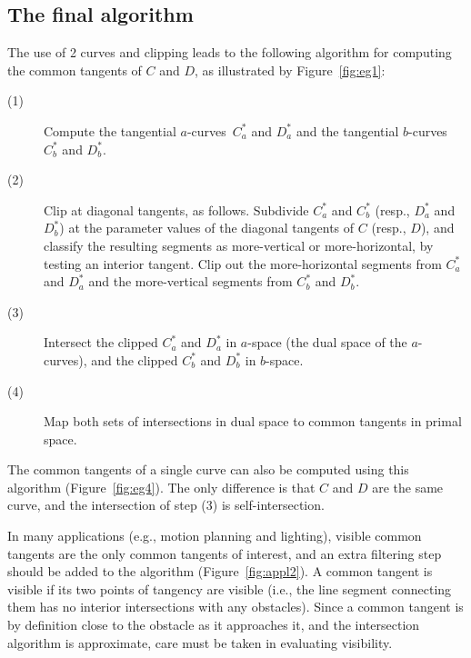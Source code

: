 \documentclass[9pt,twocolumn]{article}
\newcommand{\atangs}{tangential $a$-curves\ }
\newcommand{\btangs}{tangential $b$-curves\ }
\begin{document}
\subsection{The final algorithm}

The use of 2 curves and clipping leads to the following algorithm
for computing the common tangents of $C$ and $D$, 
as illustrated by Figure~\ref{fig:eg1}:
\begin{description}
\item[(1)]	Compute the \atangs $C_a^*$ and $D_a^*$ 
		and the \btangs $C_b^*$ and $D_b^*$.
\item[(2)]  	Clip at diagonal tangents, as follows.
		Subdivide $C_a^*$ and $C_b^*$ (resp., $D_a^*$ and $D_b^*$)
		at the parameter values of the
		diagonal tangents of $C$ (resp., $D$),
		and classify the resulting segments
		as more-vertical or more-horizontal,
		by testing an interior tangent. %
		Clip out the more-horizontal segments from $C_a^*$ and $D_a^*$
		and the more-vertical segments from $C_b^*$ and $D_b^*$.
\item[(3)] 	Intersect the clipped $C_a^*$ and $D_a^*$ in $a$-space
		(the dual space of the $a$-curves),
		and the clipped $C_b^*$ and $D_b^*$ in $b$-space.
\item[(4)]	Map both sets of intersections in dual space to 
		common tangents in primal space.
\end{description}

The common tangents of a single curve can also be computed using this algorithm
(Figure~\ref{fig:eg4}).
The only difference is that $C$ and $D$ are the same curve,
and the intersection of step (3) is self-intersection.

In many applications (e.g., motion planning and lighting),
visible common tangents are the only common tangents of interest,
and an extra filtering step should be added to the algorithm (Figure~\ref{fig:appl2}).
A common tangent is visible if its two points of tangency
are visible (i.e., the line segment connecting them
has no interior intersections with any obstacles).
Since a common tangent is by definition close to the 
obstacle as it approaches it, and the intersection algorithm is approximate,
care must be taken in evaluating visibility.
\end{document}

